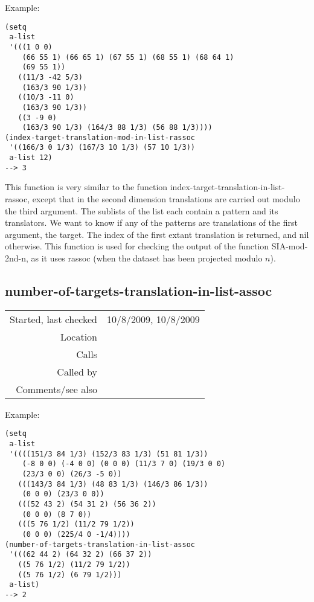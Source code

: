 \vspace{0.5cm}
\noindent Example:
\begin{verbatim}
(setq
 a-list
 '(((1 0 0)
    (66 55 1) (66 65 1) (67 55 1) (68 55 1) (68 64 1)
    (69 55 1))
   ((11/3 -42 5/3)
    (163/3 90 1/3))
   ((10/3 -11 0)
    (163/3 90 1/3))
   ((3 -9 0)
    (163/3 90 1/3) (164/3 88 1/3) (56 88 1/3))))
(index-target-translation-mod-in-list-rassoc
 '((166/3 0 1/3) (167/3 10 1/3) (57 10 1/3))
 a-list 12)
--> 3
\end{verbatim}

\noindent This function is very similar to the
function index-target-translation-in-list-rassoc,
except that in the second dimension translations are
carried out modulo the third argument. The sublists of
the list each contain a pattern and its translators.
We want to know if any of the patterns are
translations of the first argument, the target. The
index of the first extant translation is returned, and
nil otherwise. This function is used for checking the
output of the function SIA-mod-2nd-n, as it uses
rassoc (when the dataset has been projected modulo
$n$).


\subsection*{number-of-targets-translation-in-list-assoc}\label{fun:number-of-targets-translation-in-list-assoc}

\vspace{0.3cm}
\begin{tabular}{r|p{8cm}}
Started, last checked & 10/8/2009, 10/8/2009 \\
Location & \nameref{sec:evaluation-for-SIA+} \\
Calls & \nameref{fun:index-target-translation-in-list-assoc} \\
Called by & \\
Comments/see also &
\end{tabular}

\vspace{0.5cm}
\noindent Example:
\begin{verbatim}
(setq
 a-list
 '((((151/3 84 1/3) (152/3 83 1/3) (51 81 1/3))
    (-8 0 0) (-4 0 0) (0 0 0) (11/3 7 0) (19/3 0 0) 
    (23/3 0 0) (26/3 -5 0))
   (((143/3 84 1/3) (48 83 1/3) (146/3 86 1/3))
    (0 0 0) (23/3 0 0))
   (((52 43 2) (54 31 2) (56 36 2))
    (0 0 0) (8 7 0))
   (((5 76 1/2) (11/2 79 1/2))
    (0 0 0) (225/4 0 -1/4))))
(number-of-targets-translation-in-list-assoc
 '(((62 44 2) (64 32 2) (66 37 2))
   ((5 76 1/2) (11/2 79 1/2))
   ((5 76 1/2) (6 79 1/2)))
 a-list)
--> 2
\end{verbatim}

